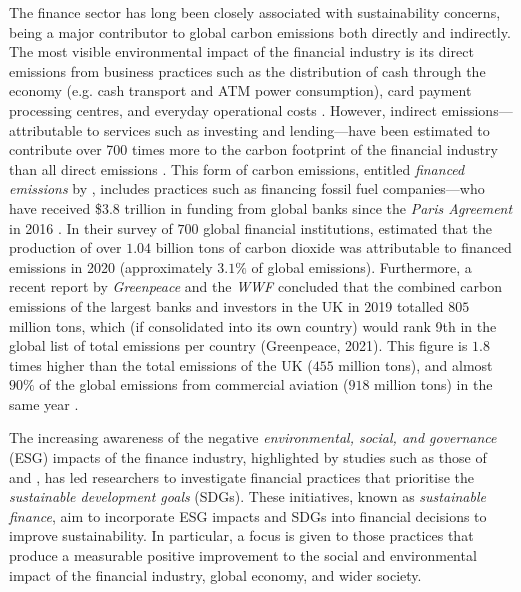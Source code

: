 \documentclass[a4paper, 11pt]{report}
\begin{document}
    The finance sector has long been closely associated with sustainability concerns, being a major contributor to global carbon emissions both directly and indirectly. The most visible environmental impact of the financial industry is its direct emissions from business practices such as the distribution of cash through the economy (e.g. cash transport and ATM power consumption), card payment processing centres, and everyday operational costs \citep{hanegraaf-2018}. However, indirect emissions---attributable to services such as investing and lending---have been estimated to contribute over 700 times more to the carbon footprint of the financial industry than all direct emissions \citep{power-2020}. This form of carbon emissions, entitled \emph{financed emissions} by \citet{power-2020}, includes practices such as financing fossil fuel companies---who have received \$3.8 trillion in funding from global banks since the \emph{Paris Agreement} in 2016 \citep{rainforest-2021}. In their survey of $700$ global financial institutions, \citet{power-2020} estimated that the production of over $1.04$ billion tons of carbon dioxide was attributable to financed emissions in 2020 (approximately $3.1\%$ of global emissions). Furthermore, a recent report by \emph{Greenpeace} and the \emph{WWF} concluded that the combined carbon emissions of the largest banks and investors in the UK in 2019 totalled $805$ million tons, which (if consolidated into its own country) would rank 9th in the global list of total emissions per country (Greenpeace, 2021). This figure is $1.8$ times higher than the total emissions of the UK ($455$ million tons), and almost $90\%$ of the global emissions from commercial aviation ($918$ million tons) in the same year \citep{graver-2020}.

    The increasing awareness of the negative \emph{environmental, social, and governance} (ESG) impacts of the finance industry, highlighted by studies such as those of \citet{power-2020} and \citet{greenpeace-2021}, has led researchers to investigate financial practices that prioritise the \emph{sustainable development goals} (SDGs). These initiatives, known as \emph{sustainable finance}, aim to incorporate ESG impacts and SDGs into financial decisions to improve sustainability. In particular, a focus is given to those practices that produce a measurable positive improvement to the social and environmental impact of the financial industry, global economy, and wider society. 
\end{document}
